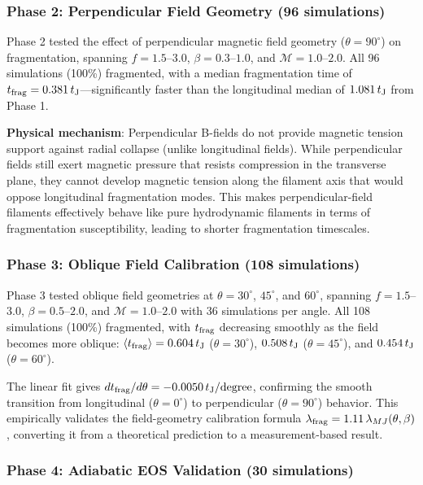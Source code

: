 \documentclass[twocolumn]{mnras}
\begin{document}
\subsubsection{Phase 2: Perpendicular Field Geometry (96 simulations)}

Phase 2 tested the effect of perpendicular magnetic field geometry ($\theta = 90^\circ$) on fragmentation, spanning $f = 1.5$--$3.0$, $\beta = 0.3$--$1.0$, and $\mathcal{M} = 1.0$--$2.0$. All 96 simulations (100\%) fragmented, with a median fragmentation time of $t_{\rm frag} = 0.381\,t_{\rm J}$---significantly faster than the longitudinal median of $1.081\,t_{\rm J}$ from Phase 1.

\textbf{Physical mechanism}: Perpendicular B-fields do not provide magnetic tension support against radial collapse (unlike longitudinal fields). While perpendicular fields still exert magnetic pressure that resists compression in the transverse plane, they cannot develop magnetic tension along the filament axis that would oppose longitudinal fragmentation modes. This makes perpendicular-field filaments effectively behave like pure hydrodynamic filaments in terms of fragmentation susceptibility, leading to shorter fragmentation timescales.

\subsubsection{Phase 3: Oblique Field Calibration (108 simulations)}

Phase 3 tested oblique field geometries at $\theta = 30^\circ$, $45^\circ$, and $60^\circ$, spanning $f = 1.5$--$3.0$, $\beta = 0.5$--$2.0$, and $\mathcal{M} = 1.0$--$2.0$ with 36 simulations per angle. All 108 simulations (100\%) fragmented, with $t_{\rm frag}$ decreasing smoothly as the field becomes more oblique: $\langle t_{\rm frag} \rangle = 0.604\,t_{\rm J}$ ($\theta = 30^\circ$), $0.508\,t_{\rm J}$ ($\theta = 45^\circ$), and $0.454\,t_{\rm J}$ ($\theta = 60^\circ$).

The linear fit gives $dt_{\rm frag}/d\theta = -0.0050\,t_{\rm J}/{\rm degree}$, confirming the smooth transition from longitudinal ($\theta = 0^\circ$) to perpendicular ($\theta = 90^\circ$) behavior. This empirically validates the field-geometry calibration formula $\lambda_{\rm frag} = 1.11\,\lambda_{MJ}(\theta, \beta)$, converting it from a theoretical prediction to a measurement-based result.

\subsubsection{Phase 4: Adiabatic EOS Validation (30 simulations)}
\end{document}
